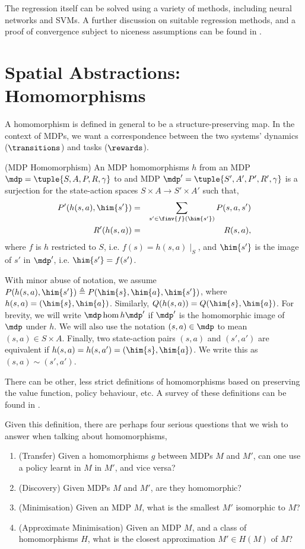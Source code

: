 The regression itself can be solved using a variety of methods,
including neural networks and SVMs. A further discussion on suitable
regression methods, and a proof of convergence subject to niceness
assumptions can be found in \citet{Andra2008}.

\section{Spatial Abstractions: Homomorphisms}
\label{sec:background:homs}

A homomorphism is defined in general to be a structure-preserving map.
In the context of MDPs, we want a correspondence between the two
systems' dynamics ($\transitions$) and tasks ($\rewards$). 

\begin{definition}(MDP Homomorphism)
An MDP homomorphisms $h$ from an MDP $\mdp = \tuple{S,A,P,R,\gamma}$ to
and MDP $\mdp' = \tuple{S',A',P',R',\gamma}$ is a surjection for the
state-action spaces $S \times A \to S' \times A'$ such that,
\begin{eqnarray}
  P'(h(s,a),\him{s'}) &=& \sum_{s' \in \finv{f}(\him{s'})} P(s,a,s') \label{condition:hom-P} \\
  R'(h(s,a)) &=& R(s,a), \label{condition:hom-R} 
\end{eqnarray}
\noindent
where $f$ is $h$ restricted to $S$, i.e. $f(s) = h(s,a)\mid_S$, and
$\him{s'}$ is the image of $s'$ in $\mdp'$, i.e. $\him{s'} = f(s')$.
\end{definition}

With minor abuse of notation, we assume $P(h(s,a),\him{s'}) \triangleq
P(\him{s}, \him{a}, \him{s'})$, where $h(s,a) = (\him{s}, \him{a})$.
Similarly, $Q(h(s,a)) = Q(\him{s},\him{a})$. For brevity, we will write
$\mdp \hom{h} \mdp'$ if $\mdp'$ is the homomorphic image of $\mdp$ under
$h$. We will also use the notation $(s,a) \in \mdp$ to mean $(s,a) \in
S \times A$. Finally, two state-action pairs $(s,a)$ and $(s',a')$ are
equivalent if $h(s,a) = h(s,a') = (\him{s},\him{a})$. We write this as
$(s,a) \sim (s',a')$.

There can be other, less strict definitions of homomorphisms based on
preserving the value function, policy behaviour, etc. A survey of these
definitions can be found in \cite{Li06}.

Given this definition, there are perhaps four serious questions that
we wish to answer when talking about homomorphisms,
\begin{enumerate}
  \item (Transfer) Given a homomorphisms $g$ between MDPs $M$ and $M'$,
    can one use a policy learnt in $M$ in $M'$, and vice versa?
  \item (Discovery) Given MDPs $M$ and $M'$, are they homomorphic? 
  \item (Minimisation) Given an MDP $M$, what is the smallest $M'$
    isomorphic to $M$?
  \item (Approximate Minimisation) Given an MDP $M$, and a class of
    homomorphisms $H$, what is the closest approximation $M' \in H(M)$
    of $M$?
\end{enumerate}

